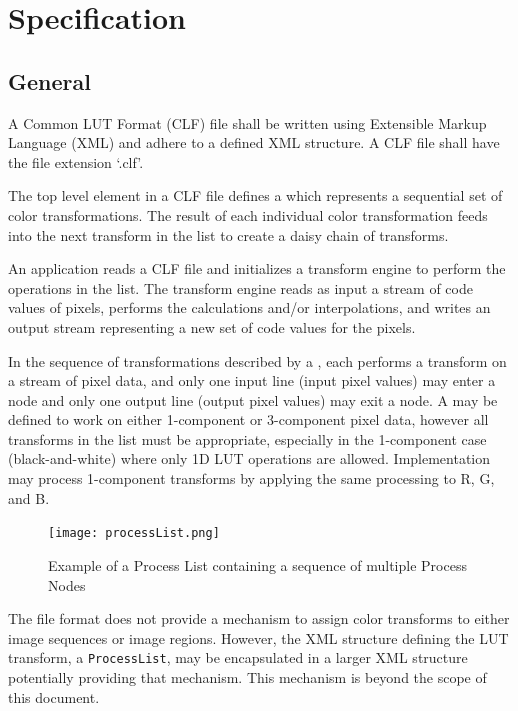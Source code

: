 \regularsectionformat
\chapter{Specification}
\label{sec:specification}

\section{General}
A Common LUT Format (CLF) file shall be written using Extensible Markup Language (XML) and adhere to a defined XML structure. A CLF file shall have the file extension `.clf'. 

The top level element in a CLF file defines a  which represents a sequential set of color transformations. The result of each individual color transformation feeds into the next transform in the list to create a daisy chain of transforms.

An application reads a CLF file and initializes a transform engine to perform the operations in the list. The transform engine reads as input a stream of code values of pixels, performs the calculations and/or interpolations, and writes an output stream representing a new set of code values for the pixels.  

In the sequence of transformations described by a , each  performs a transform on a stream of pixel data, and only one input line (input pixel values) may enter a node and only one output line (output pixel values) may exit a node. A  may be defined to work on either 1-component or 3-component pixel data, however all transforms in the list must be appropriate, especially in the 1-component case (black-and-white) where only 1D LUT operations are allowed. Implementation may process 1-component transforms by applying the same processing to R, G, and B.
 
\begin{figure}[htbp]
\begin{center}
    \texttt{[image: processList.png]}
\caption{Example of a Process List containing a sequence of multiple Process Nodes}
\label{fig:lmt}
\end{center}
\end{figure}

The file format does not provide a mechanism to assign color transforms to either image sequences or image regions. However, the XML structure defining the LUT transform, a \texttt{ProcessList}, may be encapsulated in a larger XML structure potentially providing that mechanism. This mechanism is beyond the scope of this document.

